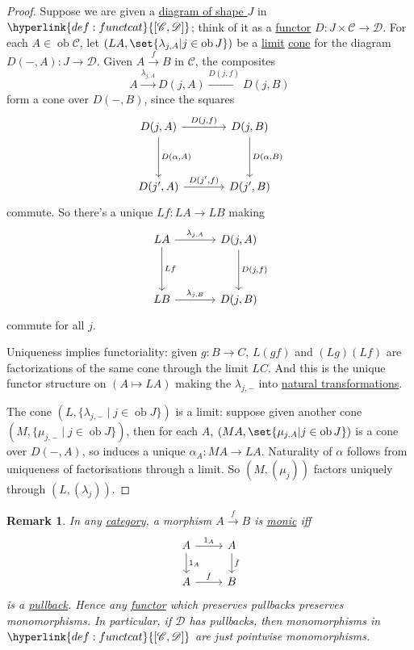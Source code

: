 \documentclass{article}
\DeclareMathOperator{\ob}{ob}
\let\to\longrightarrow
\let\mapsto\longmapsto
\newtheorem{nremark}[nthm]{Remark}
\begin{document}
\begin{proof}
  Suppose we are given a \hyperlink{def:diagram}{diagram of shape $J$} in $\hyperlink{def:functcat}{[\mathscr{C}, \mathscr{D}]}$; think of it as a \hyperlink{def:funct}{functor} $D: J \times \mathscr{C} \to \mathscr{D}$.
  For each $A \in \ob \mathscr{C}$, let $(LA, \set{\lambda_{j,A} | j \in \ob J})$ be a \hyperlink{def:limit}{limit} \hyperlink{def:cone}{cone} for the diagram $D(-, A): J \to \mathscr{D}$.
  Given $A \overset{f}\to B$ in $\mathscr{C}$, the composites
  \begin{equation*}
    A \overset{\lambda_{j,A}}\to D(j,A)\overset{D(j,f)}\to D(j,B)
  \end{equation*}
  form a cone over $D(-,B)$, since the squares
  \begin{equation*}
    \begin{tikzcd}[column sep=large, row sep=huge]
      {D(j,A)} \arrow[r, "{D(j,f)}"] \arrow[d, "{D(\alpha,A)}"] & {D(j,B)} \arrow[d, "{D(\alpha,B)}"] \\
      {D(j',A)} \arrow[r, "{D(j',f)}"] & {D(j',B)}
    \end{tikzcd}
  \end{equation*}
  commute.
  So there's a unique $Lf: LA \to LB$ making
  \begin{equation*}
    \begin{tikzcd}[column sep=large, row sep=huge]
    LA \rar{\lambda_{j,A}} \dar{Lf} & D(j,A) \dar{D(j,f)} \\
    LB \rar{\lambda_{j,B}} & D(j,B)
    \end{tikzcd}
  \end{equation*}
  commute for all $j$.

  Uniqueness implies functoriality: given $g: B \to C$, $L(gf)$ and $(Lg)(Lf)$ are factorizations of the same cone through the limit $LC$.
  And this is the unique functor structure on $(A \mapsto LA)$ making the $\lambda_{j, -}$ into \hyperlink{def:nattrans}{natural transformations}.

  The cone $(L, \{\lambda_{j, -} \mid j \in \ob J\})$ is a limit: suppose given another cone $(M, \{\mu_{j,-} \mid j \in \ob J\})$, then for each $A$, $(MA, \set{\mu_{j,A} | j \in \ob J})$ is a cone over $D(-,A)$, so induces a unique $\alpha_A: MA \to LA$.
  Naturality of $\alpha$ follows from uniqueness of factorisations through a limit.
  So $(M, (\mu_j))$ factors uniquely through $(L, (\lambda_j))$.
\end{proof}
\begin{nremark}\label{rem:4.8}
  In any \hyperlink{def:cat}{category}, a morphism $A \overset f\to B$ is \hyperlink{def:monic}{monic} iff
  \begin{equation*}
    \begin{tikzcd}
      A \rar{1_A} \dar{1_A} & A \dar{f}\\ A \rar{f} & B
    \end{tikzcd}
  \end{equation*}
    is a \hyperlink{def:pullback}{pullback}.
    Hence any \hyperlink{def:funct}{functor} which preserves pullbacks preserves monomorphisms.
    In particular, if $\mathscr{D}$ has pullbacks, then monomorphisms in $\hyperlink{def:functcat}{[\mathscr{C}, \mathscr{D}]}$ are just pointwise monomorphisms.
\end{nremark}
\end{document}
